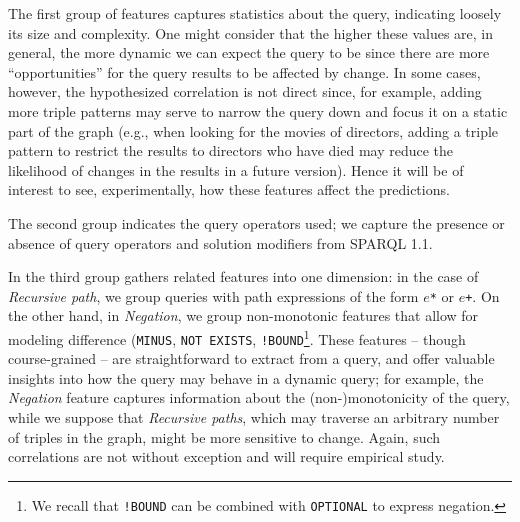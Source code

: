 \documentclass[runningheads]{llncs}
\begin{document}
The first group of features captures statistics about the query, indicating loosely its size and complexity. One might consider that the higher these values are, in general, the more dynamic we can expect the query to be since there are more ``opportunities'' for the query results to be affected by change. In some cases, however, the hypothesized correlation is not direct since, for example, adding more triple patterns may serve to narrow the query down and focus it on a static part of the graph (e.g., when looking for the movies of directors, adding a triple pattern to restrict the results to directors who have died may reduce the likelihood of changes in the results in a future version). Hence it will be of interest to see, experimentally, how these features affect the predictions.

The second group indicates the query operators used; we capture the presence or absence of query operators and solution modifiers from SPARQL 1.1. 

In the third group gathers related features into one dimension: in the case of \textit{Recursive path}, we group queries with path expressions of the form $e$\texttt{*} or $e$\texttt{+}. On the other hand, in \textit{Negation}, we group non-monotonic features that allow for modeling difference (\texttt{MINUS}, \texttt{NOT EXISTS}, \texttt{!BOUND}\footnote{We recall that \texttt{!BOUND} can be combined with \texttt{OPTIONAL} to express negation.}. These features -- though course-grained -- are straightforward to extract from a query, and offer valuable insights into how the query may behave in a dynamic query; for example, the \textit{Negation} feature captures information about the (non-)monotonicity of the query, while we suppose that \textit{Recursive paths}, which may traverse an arbitrary number of triples in the graph, might be more sensitive to change. Again, such correlations are not without exception and will require empirical study.
\end{document}
